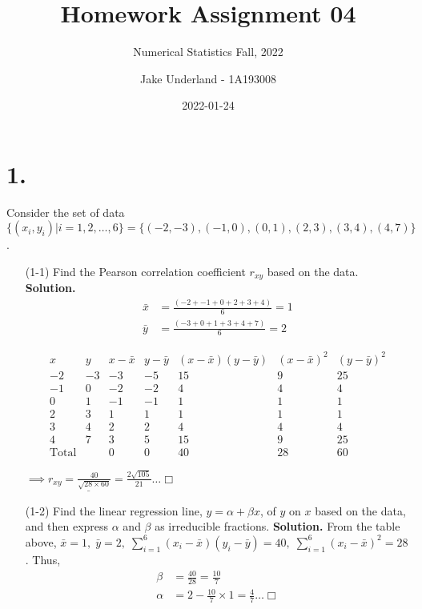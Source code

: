 \documentclass[
]{article}
\title{Homework Assignment 04}
\subtitle{Numerical Statistics Fall, 2022}
\author{Jake Underland - 1A193008}
\date{2022-01-24}
\begin{document}
\maketitle

\hypertarget{section}{%
\section{1.}\label{section}}

Consider the set of data
\(\{(x_i,y_i)|i=1, 2, \dots, 6\} = \{(-2, -3), (-1, 0), (0, 1), (2, 3), (3, 4), (4, 7)\}\).

\begin{enumerate}
\item[(1-1)] Find the Pearson correlation coefficient $r_{xy}$ based on the data.
\newline
\textbf{Solution.}\newline
\begin{align*} \bar{x} &= \frac{(-2 + -1 + 0 + 2 + 3 + 4)}6  =1\\
\bar{y} &= \frac{(-3 + 0 + 1 + 3 +4 + 7)}6 = 2
\end{align*}

$$\begin{array}{ccccccc}
x & y & x - \bar{x} & y - \bar{y} & (x - \bar{x})(y - \bar{y}) & (x - \bar{x})^2 & (y - \bar{y})^2 \\
\hline 
-2 & -3 & -3 & -5 & 15 & 9 & 25 \\
-1 & 0 & -2 & -2 & 4 & 4 & 4 \\
0 & 1 & -1  &  -1 & 1 & 1 & 1 \\
2 & 3 & 1  &  1 & 1 & 1 & 1 \\
3 & 4 & 2  &  2 & 4 & 4 & 4 \\
4 & 7 & 3  &  5 & 15 & 9 & 25 \\
\hline 
\text{Total} && 0 & 0 & 40 & 28 & 60
\end{array}$$

\hfill$\underline{\implies r_{xy} = \frac{40}{\sqrt{28\times 60}} = \frac{2\sqrt{105}}{21}} \ldots\Box$

\item[(1-2)] Find the linear regression line, $y = \alpha + \beta x$, of $y$ on $x$ based on the data, and then express $\alpha$ and $\beta$ as irreducible fractions.  
\newline
\textbf{Solution.}\newline
From the table above, $\bar{x} = 1, \;\bar{y} = 2, \; \sum_{i=1}^6(x_i-\bar{x})(y_i-\bar{y}) = 40,\; \sum_{i=1}^6(x_i-\bar{x})^2= 28$.  
Thus, 
$$\begin{aligned}
\beta &= \frac{40}{28} = \frac{10}{7} \\
\alpha &= 2 - \frac{10}{7} \times 1 = \frac{4}{7} \dots \Box
\end{aligned}$$



\end{enumerate}
\end{document}
